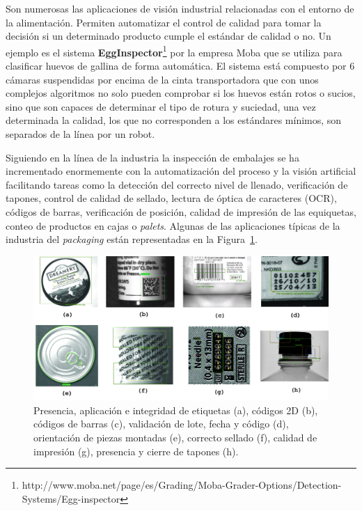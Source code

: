 Son numerosas las aplicaciones de visión industrial relacionadas con el entorno de la alimentación. Permiten automatizar el control de calidad para tomar la decisión si un determinado producto cumple el estándar de calidad o no. Un ejemplo es el sistema \textbf{EggInspector}\footnote{http://www.moba.net/page/es/Grading/Moba-Grader-Options/Detection-Systems/Egg-inspector} por la empresa Moba que se utiliza para clasificar huevos de gallina de forma automática. El sistema está compuesto por 6 cámaras suspendidas por encima de la cinta transportadora que con unos complejos algoritmos no solo pueden comprobar si los huevos están rotos o sucios, sino que son capaces de determinar el tipo de rotura y suciedad, una vez determinada la calidad, los que no corresponden a los estándares mínimos, son separados de la línea por un robot.

Siguiendo en la línea de la industria la inspección de embalajes se ha incrementado enormemente con la automatización del proceso y la visión artificial facilitando tareas como la detección del correcto nivel de llenado, verificación de tapones, control de calidad de sellado, lectura de óptica de caracteres (OCR), códigos de barras, verificación de posición, calidad de impresión de las equiquetas, conteo de productos en cajas o \textit{palets}. Algunas de las aplicaciones típicas de la industria del \textit{packaging} están representadas en la Figura~\ref{fig:Industry}.

\begin{figure}[th]
\centering
\includegraphics[scale=0.17]{Figures/industry.png}
\decoRule
\caption[Industry]{Presencia, aplicación e integridad de etiquetas (a), códigos 2D (b), códigos de barras (c), validación de lote, fecha y código (d), orientación de piezas montadas (e), correcto sellado (f), calidad de impresión (g), presencia y cierre de tapones (h). }
\label{fig:Industry}
\end{figure}

